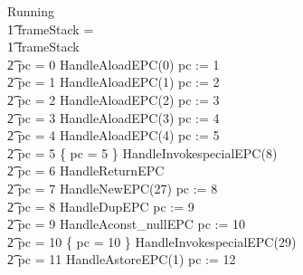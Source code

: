 \begin{figure}[tp]
  \setlength{\zedindent}{0cm}
  \setlength{\zedtab}{0.3cm}
  \setlength{\zedleftsep}{0.1cm}
  \begin{circus}
    Running \circdef \\
    \t1 \circif frameStack = \emptyset \circthen \Skip \\
    \t1 {} \circelse frameStack \neq \emptyset \circthen {} \\
    \t2 \circif pc = 0 \circthen HandleAloadEPC(0) \circseq pc := 1 \\
    \t2 {} \circelse pc = 1 \circthen HandleAloadEPC(1) \circseq pc := 2 \\
    \t2 {} \circelse pc = 2 \circthen HandleAloadEPC(2) \circseq pc := 3 \\
    \t2 {} \circelse pc = 3 \circthen HandleAloadEPC(3) \circseq pc := 4 \\
    \t2 {} \circelse pc = 4 \circthen HandleAloadEPC(4) \circseq pc := 5 \\
    \t2 {} \circelse pc = 5 \circthen \{ pc = 5 \} \circseq HandleInvokespecialEPC(8) \\
    \t2 {} \circelse pc = 6 \circthen HandleReturnEPC \\
    \t2 {} \circelse pc = 7 \circthen HandleNewEPC(27) \circseq pc := 8 \\
    \t2 {} \circelse pc = 8 \circthen HandleDupEPC \circseq pc := 9 \\
    \t2 {} \circelse pc = 9 \circthen HandleAconst\_nullEPC \circseq pc := 10 \\
    \t2 {} \circelse pc = 10 \circthen \{ pc = 10 \} \circseq HandleInvokespecialEPC(29) \\
    \t2 {} \circelse pc = 11 \circthen HandleAstoreEPC(1) \circseq pc := 12 \\

\end{circus}
\end{figure}
